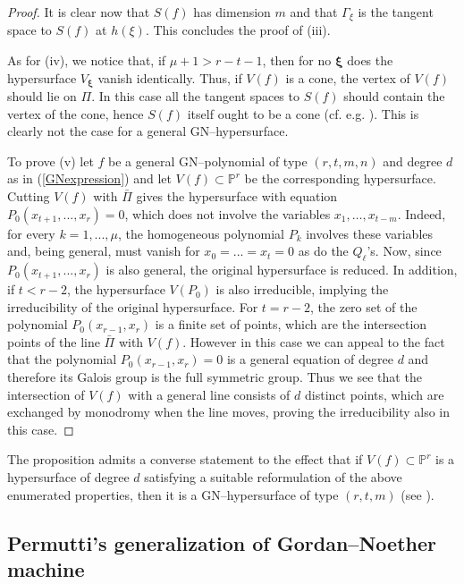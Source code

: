 \documentclass[11pt]{article}   %
\theoremstyle{definition}
\numberwithin{Theorem}{section} \numberwithin{equation}{section}
\newcommand{\p}{{\mathbb P}}
\begin{document}
{\begin{proof}
It is clear now that $S(f)$ has dimension $m$ and that $\Gamma_\xi$ is the
tangent space to $S(f)$ at $h(\xi)$. This concludes the proof of (iii).

As for (iv), we notice that,  if $\mu+1>r-t-1$, then for no $\mathbf
\xi$ does the hypersurface $V_{\mathbf \xi}$ vanish identically.
Thus, if $V(f)$ is a cone, the vertex of $V(f)$ should lie on $\Pi$.
In this case all the tangent spaces to $S(f)$ should contain the
vertex of the cone, hence $S(f)$ itself ought to be a cone (cf. e.g.
\cite [Proposition 1.2.6]{Ru}). This is clearly not  the case for a
general GN--hypersurface.

To prove (v) let $f$ be a general GN--polynomial of type
$(r,t,m,n)$ and degree $d$ as in (\ref{GNexpression}) and let
$V(f)\subset\p^r$ be the corresponding hypersurface.
Cutting $V(f)$ with $\bar \Pi$ gives the hypersurface
with equation $P_0(x_{t+1},...,x_r)=0$, which does not involve the
variables $x_1,\ldots,x_{t-m}$. Indeed, for every $k=1,...,\mu$, the
homogeneous polynomial $P_k$ involves these variables and, being
general, must vanish for $x_0=...=x_t=0$ as do the $Q_\ell$'s. Now,
since $P_0(x_{t+1},...,x_r)$ is also general, the original
hypersurface is reduced. In addition, if $t<r-2$, the hypersurface
$V(P_0)$ is also irreducible, implying the irreducibility of the
original hypersurface. For $t=r-2$, the zero set of the polynomial
$P_0(x_{r-1},x_r)$ is a finite set of points, which are the
intersection points of the line $\bar \Pi$ with $V(f)$. However in this
case we can appeal to the fact that the polynomial
$P_0(x_{r-1},x_r)=0$ is a general equation of degree $d$ and
therefore its Galois group is the full symmetric group. Thus we see
that the intersection of $V(f)$ with a general line consists of $d$
distinct points, which are exchanged by monodromy when the line
moves, proving the irreducibility also in this case.
\end{proof}




The proposition admits a converse statement to the effect that if
$V(f)\subset\p^r$ is a hypersurface of degree $d$ satisfying a suitable
reformulation of the above enumerated properties, then it is a
GN--hypersurface of type $(r,t,m)$ (see \cite[pp. 104--105]{Permutti3}).



\subsection{Permutti's generalization of Gordan--Noether machine}


}
\end{document}

